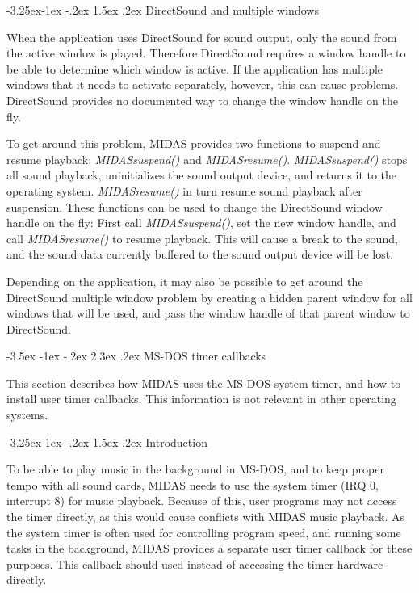 \documentclass[a4paper,12pt,oneside]{book}
\makeatletter
\renewcommand\section{\@startsection {section}{1}{-20pt}%
                                   {-3.5ex \@plus -1ex \@minus -.2ex}%
                                   {2.3ex \@plus.2ex}%
                                   {\normalfont\Large\bfseries}}
\renewcommand\subsection{\@startsection{subsection}{2}{-20pt}%
                                     {-3.25ex\@plus -1ex \@minus -.2ex}%
                                     {1.5ex \@plus .2ex}%
                                     {\normalfont\large\bfseries}}
\makeatother
\begin{document}
\subsection{DirectSound and multiple windows}

When the application uses DirectSound for sound output, only the sound from
the active window is played. Therefore DirectSound requires a window handle
to be able to determine which window is active. If the application has
multiple windows that it needs to activate separately, however, this can
cause problems. DirectSound provides no documented way to change the window
handle on the fly.

To get around this problem, MIDAS provides two functions to suspend and
resume playback: {\em MIDASsuspend()} and {\em MIDASresume()}. {\em
MIDASsuspend()} stops all sound playback, uninitializes the sound output
device, and returns it to the operating system. {\em MIDASresume()} in turn
resume sound playback after suspension. These functions can be used to change
the DirectSound window handle on the fly: First call {\em MIDASsuspend()},
set the new window handle, and call {\em MIDASresume()} to resume playback.
This will cause a break to the sound, and the sound data currently buffered
to the sound output device will be lost.

Depending on the application, it may also be possible to get around the
DirectSound multiple window problem by creating a hidden parent window for
all windows that will be used, and pass the window handle of that parent
window to DirectSound.



\section{MS-DOS timer callbacks}

This section describes how MIDAS uses the MS-DOS system timer, and how
to install user timer callbacks. This information is not relevant in
other operating systems.


\subsection{Introduction}

To be able to play music in the background in MS-DOS, and to keep proper
tempo with all sound cards, MIDAS needs to use the system timer (IRQ 0,
interrupt 8) for music playback. Because of this, user programs may not
access the timer directly, as this would cause conflicts with MIDAS
music playback. As the system timer is often used for controlling
program speed, and
running some tasks in the background, MIDAS provides a separate user
timer callback for these purposes. This callback should used instead of
accessing the timer hardware directly.
\end{document}
